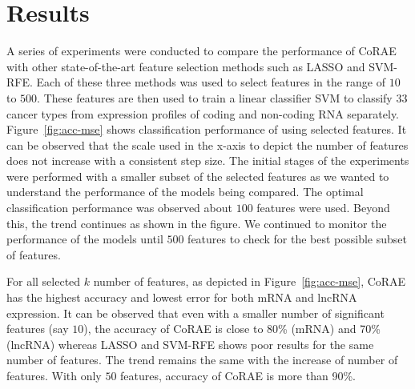 \documentclass{bioinfo}
\begin{document}
\section{Results}
A series of experiments were conducted to compare the performance of CoRAE with other state-of-the-art feature selection methods such as LASSO and SVM-RFE.
Each of these three methods was used to select features in the range of $10$ to $500$.
These features are then used to train a linear classifier SVM to classify 33 cancer types from expression profiles of coding and non-coding RNA separately. 
Figure~\ref{fig:acc-mse} shows classification performance of using selected features. It can be observed that the scale used in the x-axis to depict the number of features does not increase with a consistent step size.
The initial stages of the experiments were performed with a smaller subset of the selected features as we wanted to understand the performance of the models being compared.
The optimal classification performance was observed about $100$ features were used.
Beyond this, the trend continues as shown in the figure. We continued to monitor the performance of the models until $500$ features to check for the best possible subset of features. 

For all selected $k$ number of features, as depicted in Figure~\ref{fig:acc-mse}, CoRAE has the highest accuracy and lowest error for both mRNA and lncRNA expression.
It can be observed that even with a smaller number of significant features (say $10$), the accuracy of CoRAE is close to 80\% (mRNA) and 70\% (lncRNA) whereas LASSO and SVM-RFE shows poor results for the same number of features.
The trend remains the same with the increase of number of features. With only $50$ features, accuracy of CoRAE is more than 90\%.
\end{document}
